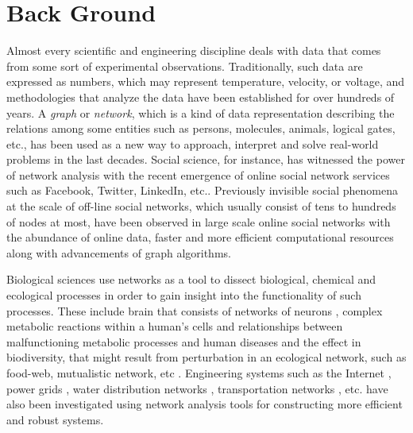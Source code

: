 \section*{Back Ground}%
Almost every scientific and engineering discipline deals with data that comes from some sort of experimental observations. Traditionally, such data are expressed as numbers, which may represent temperature, velocity, or voltage, and methodologies that analyze the data have been established for over hundreds of years. A \textit{graph} or \textit{network}, which is a kind of data representation describing the relations among some entities such as persons, molecules, animals, logical gates, etc., has been used as a new way to approach, interpret and solve real-world problems in the last decades. Social science, for instance, has witnessed the power of network analysis with the recent emergence of online social network services such as Facebook, Twitter, LinkedIn, etc.\cite{Kleinberg:1}. Previously invisible social phenomena at the scale of off-line social networks, which usually consist of tens to hundreds of nodes at most, have been observed in large scale online social networks with the abundance of online data, faster and more efficient computational resources along with advancements of graph algorithms.
	
	
	Biological sciences use networks as a tool to dissect biological, chemical and ecological processes in order to gain insight into the functionality of such processes. These include brain that consists of networks of neurons \cite{BrainNetwork}, complex metabolic reactions within a human's cells and relationships between malfunctioning metabolic processes and human diseases \cite{MetabolicNetworkAndDiseases} and the effect in biodiversity, that might result from perturbation in an ecological network, such as food-web, mutualistic network, etc \cite{EcologicalNetwork}. Engineering systems such as the Internet \cite{Internet}, power grids \cite{PowerGrid}, water distribution networks \cite{WaterDistribution}, transportation networks \cite{Train}, etc. have also been investigated using network analysis tools for constructing more efficient and robust systems. 
	
